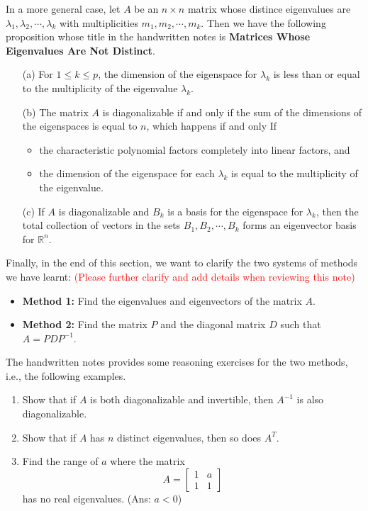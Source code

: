 \documentclass[10pt, a4paper]{article}
\newcommand{\R}{\mathbb{R}}
\begin{document}
In a more general case, let $A$ be an $n\times n$ matrix whose distince eigenvalues are $\lambda_1,\lambda_2,\cdots,\lambda_k$ with multiplicities $m_1,m_2,\cdots,m_k$. Then we have the following proposition whose title in the handwritten notes is \textbf{Matrices Whose Eigenvalues Are Not Distinct}.
\begin{itemize}
    \item[(a)] For $1\leq k\leq p$, the dimension of the eigenspace for $\lambda_k$ is less than or equal to the multiplicity of the eigenvalue $\lambda_k$.
    \item[(b)] The matrix $A$ is diagonalizable if and only if the sum of the dimensions of the eigenspaces is equal to $n$, which happens if and only If
    \begin{itemize}
        \item the characteristic polynomial factors completely into linear factors, and
        \item the dimension of the eigenspace for each $\lambda_k$ is equal to the multiplicity of the eigenvalue.
    \end{itemize}
    \item[(c)] If $A$ is diagonalizable and $B_k$ is a basis for the eigenspace for $\lambda_k$, then the total collection of vectors in the sets $B_1,B_2,\cdots,B_k$ forms an eigenvector basis for $\R^n$.
\end{itemize}
\indent Finally, in the end of this section, we want to clarify the two systems of methods we have learnt: \textcolor{Red}{(Please further clarify and add details when reviewing this note)}
\begin{itemize}
    \item \textbf{Method 1:} Find the eigenvalues and eigenvectors of the matrix $A$.
    \item \textbf{Method 2:} Find the matrix $P$ and the diagonal matrix $D$ such that $A=PDP^{-1}$.
\end{itemize}
\indent The handwritten notes provides some reasoning exercises for the two methods, i.e., the following examples.
\begin{example}
    \begin{enumerate}
        \item Show that if $A$ is both diagonalizable and invertible, then $A^{-1}$ is also diagonalizable.
        \item Show that if $A$ has $n$ distinct eigenvalues, then so does $A^T$.
        \item Find the range of $a$ where the matrix \[
        A = \begin{bmatrix}
            1&a\\
            1&1
        \end{bmatrix}
        \]
        has no real eigenvalues. (Ans: $a<0$)
    \end{enumerate}
\end{example}
\end{document}
